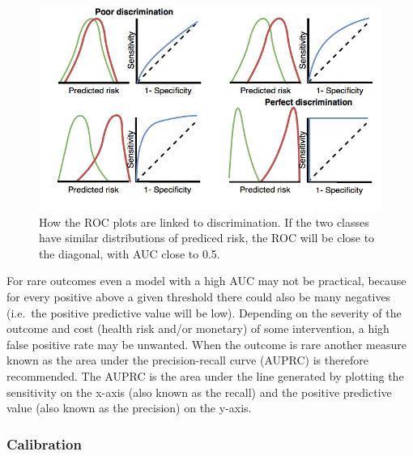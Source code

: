 \documentclass[11pt]{book}
\theoremstyle{definition}
\theoremstyle{definition}
\theoremstyle{definition}
\theoremstyle{remark}
\begin{document}
\begin{figure}
\includegraphics[width=1\linewidth]{images/PatientLevelPrediction/theory/roctheory} \caption{How the ROC plots are linked to discrimination. If the two classes have similar distributions of prediced risk, the ROC will be close to the diagonal, with AUC close to 0.5.}\label{fig:figuretheoryroctheory}
\end{figure}

For rare outcomes even a model with a high AUC may not be practical, because for every positive above a given threshold there could also be many negatives (i.e.~the positive predictive value will be low). Depending on the severity of the outcome and cost (health risk and/or monetary) of some intervention, a high false positive rate may be unwanted. When the outcome is rare another measure known as the area under the precision-recall curve (AUPRC) is therefore recommended. The AUPRC is the area under the line generated by plotting the sensitivity on the x-axis (also known as the recall) and the positive predictive value (also known as the precision) on the y-axis. 

\hypertarget{calibration}{%
\subsubsection*{Calibration}\label{calibration}}
\end{document}
